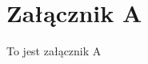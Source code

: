 \documentclass[document.tex]{subfiles}
\begin{document}
\chapter{Załącznik A}
To jest załącznik A
\end{document}
